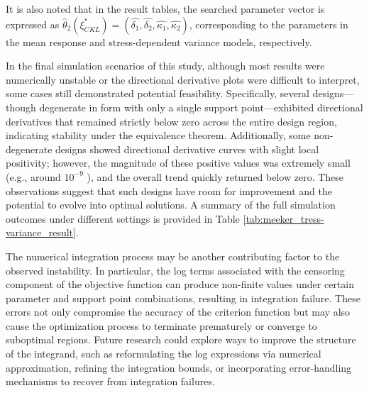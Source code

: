\hspace*{8mm} It is also noted that in the result tables, the searched parameter vector is expressed as $\hat{\theta}_2(\xi^*_{CKL})=(\hat{\delta_1},\hat{\delta_2},\hat{\kappa_1},\hat{\kappa_2})$, corresponding to the parameters in the mean response and stress-dependent variance models, respectively.

\hspace*{8mm} In the final simulation scenarios of this study, although most results were numerically unstable or the directional derivative plots were difficult to interpret, some cases still demonstrated potential feasibility. Specifically, several designs—though degenerate in form with only a single support point—exhibited directional derivatives that remained strictly below zero across the entire design region, indicating stability under the equivalence theorem. Additionally, some non-degenerate designs showed directional derivative curves with slight local positivity; however, the magnitude of these positive values was extremely small (e.g., around $10^{-9}$ ), and the overall trend quickly returned below zero. These observations suggest that such designs have room for improvement and the potential to evolve into optimal solutions. A summary of the full simulation outcomes under different settings is provided in Table \ref{tab:meeker_tress-variance_result}.

\hspace*{8mm} The numerical integration process may be another contributing factor to the observed instability. In particular, the log terms associated with the censoring component of the objective function can produce non-finite values under certain parameter and support point combinations, resulting in integration failure. These errors not only compromise the accuracy of the criterion function but may also cause the optimization process to terminate prematurely or converge to suboptimal regions. Future research could explore ways to improve the structure of the integrand, such as reformulating the log expressions via numerical approximation, refining the integration bounds, or incorporating error-handling mechanisms to recover from integration failures.


